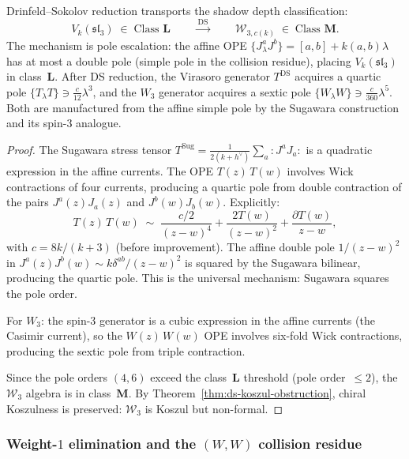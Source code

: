 \begin{proposition}
\label{prop:ds-complexity-transport-sl3}
%
%
Drinfeld--Sokolov reduction transports the shadow depth
classification:
\[
V_k(\mathfrak{sl}_3) \;\in\; \text{Class } \mathbf{L}
\qquad\xrightarrow{\;\mathrm{DS}\;}\qquad
\mathcal{W}_{3,c(k)} \;\in\; \text{Class } \mathbf{M}.
\]
The mechanism is pole escalation: the affine OPE
$\{J^a_\lambda J^b\} = [a, b] + k(a, b)\lambda$ has at
most a double pole (simple pole in the collision residue),
placing $V_k(\mathfrak{sl}_3)$ in class~$\mathbf{L}$.
After DS reduction, the Virasoro generator $T^{\mathrm{DS}}$
acquires a quartic pole $\{T_\lambda T\} \ni
\frac{c}{12}\lambda^3$, and the $W_3$ generator acquires a
sextic pole $\{W_\lambda W\} \ni \frac{c}{360}\lambda^5$.
Both are manufactured from the affine simple pole by the
Sugawara construction and its spin-$3$ analogue.
\end{proposition}

\begin{proof}
The Sugawara stress tensor
$T^{\mathrm{Sug}} = \frac{1}{2(k + h^\vee)}
\sum_a {:}J^a J_a{:}$ is a quadratic expression in the
affine currents. The OPE $T(z)\,T(w)$ involves Wick
contractions of four currents, producing a quartic pole
from double contraction of the pairs $J^a(z) J_a(z)$ and
$J^b(w) J_b(w)$. Explicitly:
\[
T(z)\,T(w)
\;\sim\; \frac{c/2}{(z-w)^4}
+ \frac{2T(w)}{(z-w)^2}
+ \frac{\partial T(w)}{z-w},
\]
with $c = 8k/(k+3)$ (before improvement). The affine
double pole $1/(z-w)^2$ in $J^a(z) J^b(w) \sim
k\delta^{ab}/(z-w)^2$ is squared by the Sugawara bilinear,
producing the quartic pole. This is the universal mechanism:
Sugawara squares the pole order.

For $W_3$: the spin-$3$ generator is a cubic expression in
the affine currents (the Casimir current), so the
$W(z)\,W(w)$ OPE involves six-fold Wick contractions,
producing the sextic pole from triple contraction.

Since the pole orders $(4, 6)$ exceed the class~$\mathbf{L}$
threshold (pole order~$\le 2$), the $\mathcal{W}_3$ algebra
is in class~$\mathbf{M}$. By
Theorem~\ref{thm:ds-koszul-obstruction}, chiral Koszulness
is preserved: $\mathcal{W}_3$ is Koszul but non-formal.
\end{proof}

\subsubsection{Weight-$1$ elimination and the $(W,W)$
collision residue}

